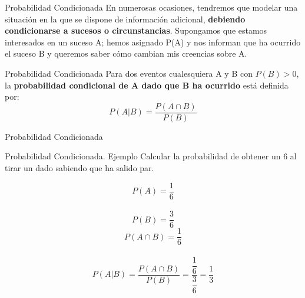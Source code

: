 \documentclass[11pt]{beamer}
\begin{document}
        \begin{frame}{Probabilidad Condicionada}
          En numerosas ocasiones, tendremos que modelar una situación en la que se dispone de información adicional, \textbf{debiendo condicionarse a sucesos o circunstancias}. Supongamos que estamos interesados en un suceso A; hemos asignado P(A) y nos informan que ha ocurrido el suceso B y queremos saber cómo cambian mis creencias sobre A.
          \pause
          \begin{block}{Probabilidad Condicionada}
            Para dos eventos cualesquiera A y B con $P(B) >  0$, la \textbf{probabilidad condicional de A dado que B ha ocurrido} está definida por:
            $$ P(A|B)=\dfrac{P(A\cap B)}{P(B)}$$
          \end{block}

        \end{frame}

        \begin{frame}{Probabilidad Condicionada}

            \begin{block}{Probabilidad Condicionada. Ejemplo}
                Calcular la probabilidad de obtener un 6 al tirar un dado sabiendo que ha salido par.
             \end{block}
            \pause
            \begin{block}{}
                $$P(A)= \dfrac{1}{6} $$\\
                $$P(B)= \dfrac{3}{6}$$
                $$P(A\cap B) = \dfrac{1}{6}$$\\
                $$ P(A|B)=\dfrac{P(A\cap B)}{P(B)} = \dfrac{\dfrac{1}{6}}{\dfrac{3}{6}}=\dfrac{1}{3}$$
            \end{block}
        \end{frame}
\end{document}
